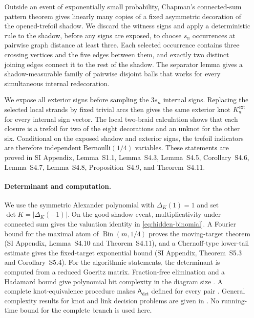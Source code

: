 \documentclass[9pt,twoside]{pnas-new}
\theoremstyle{definition}
\theoremstyle{remark}
\newcommand{\SILocation}[1]{SI Appendix, #1}
\newcommand{\SIShadowSignLaw}{Lemma~S1.1}
\newcommand{\SIShadowSelection}{Lemma~S4.3}
\newcommand{\SIGenuineInterface}{Lemma~S4.5}
\newcommand{\SIDistanceThreeBuffer}{Corollary~S4.6}
\newcommand{\SISimultaneousSeparators}{Lemma~S4.7}
\newcommand{\SITwoBraidClosure}{Lemma~S4.8}
\newcommand{\SIPersistentFactorization}{Proposition~S4.9}
\newcommand{\SIBinomialAtom}{Lemma~S4.10}
\newcommand{\SIDeterminantAntiConcentration}{Theorem~S4.11}
\newcommand{\SIFixedDeterminant}{Theorem~S5.3}
\newcommand{\SIFixedKnot}{Corollary~S5.4}
\begin{document}
Outside an event of exponentially small probability, Chapman's connected-sum pattern theorem gives linearly many copies of a fixed asymmetric decoration of the opened-trefoil shadow.  We discard the witness signs and apply a deterministic rule to the shadow, before any signs are exposed, to choose $s_n$ occurrences at pairwise graph distance at least three.  Each selected occurrence contains three crossing vertices and the five edges between them, and exactly two distinct joining edges connect it to the rest of the shadow.  The separator lemma gives a shadow-measurable family of pairwise disjoint balls that works for every simultaneous internal redecoration.

We expose all exterior signs before sampling the $3s_n$ internal signs.  Replacing the selected local strands by fixed trivial arcs then gives the same exterior knot $K_n^{\mathrm{ext}}$ for every internal sign vector.  The local two-braid calculation shows that each closure is a trefoil for two of the eight decorations and an unknot for the other six.  Conditional on the exposed shadow and exterior signs, the trefoil indicators are therefore independent Bernoulli$(1/4)$ variables.  These statements are proved in \SILocation{\SIShadowSignLaw{}, \SIShadowSelection{}, \SIGenuineInterface{}, \SIDistanceThreeBuffer{}, \SISimultaneousSeparators{}, \SITwoBraidClosure{}, \SIPersistentFactorization{}, and \SIDeterminantAntiConcentration{}}.

\paragraph{Determinant and computation.}
We use the symmetric Alexander polynomial with $\Delta_K(1)=1$ and set $\det K=|\Delta_K(-1)|$.  On the good-shadow event, multiplicativity under connected sum gives the valuation identity in \eqref{eq:hidden-binomial}.  A Fourier bound for the maximal atom of $\operatorname{Bin}(m,1/4)$ proves the moving-target theorem (\SILocation{\SIBinomialAtom{} and \SIDeterminantAntiConcentration{}}), and a Chernoff-type lower-tail estimate gives the fixed-target exponential bound (\SILocation{\SIFixedDeterminant{} and \SIFixedKnot{}}).  For the algorithmic statements, the determinant is computed from a reduced Goeritz matrix.  Fraction-free elimination and a Hadamard bound give polynomial bit complexity in the diagram size \cite{gordonlitherland1978,bareiss1968}.  A complete knot-equivalence procedure makes $\mathsf A_{\det}$ defined for every pair \cite{haken1961,hemion1992}.  General complexity results for knot and link decision problems are given in \cite{hasslagariaspippenger1999,lackenby2021}.  No running-time bound for the complete branch is used here.
\end{document}

